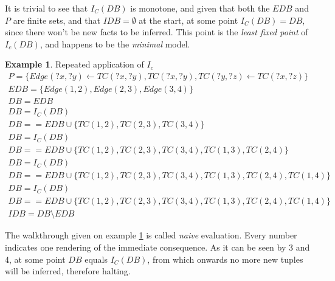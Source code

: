 \documentclass[manuscript,screen,review]{acmart}
\theoremstyle{definition}
\newtheorem{exmp}{Example}[section]
\begin{document}
It is trivial to see that $I_C(DB)$ is monotone, and given that both the $EDB$ and $P$ are finite sets, and that $IDB = \emptyset$ at the start,
at some point $I_C(DB) = DB$, since there won't be new facts to be inferred. This point is the \textit{least fixed point} of $I_c(DB)$\cite{datalog},
and happens to be the \textit{minimal} model.
\begin{exmp}{Repeated application of $I_c$}
	\begin{align}
		P = \{ Edge(?x, ?y) \leftarrow TC(?x, ?y), TC(?x, ?y), TC(?y, ?z) \leftarrow TC(?x, ?z) \} \nonumber             \\
		EDB = \{ Edge(1, 2), Edge(2, 3), Edge(3, 4) \}                                               \nonumber           \\
		DB = EDB                                                                                     \nonumber           \\
		DB = I_C(DB)                                                                                                     \\
		DB == EDB \cup \{ TC(1, 2), TC(2, 3), TC(3, 4) \}                                                      \nonumber \\
		DB = I_C(DB)                                                                                           \nonumber \\
		DB == EDB \cup \{ TC(1, 2), TC(2, 3), TC(3, 4), TC(1, 3), TC(2, 4) \}                                  \nonumber \\
		DB = I_C(DB)                                                                                                     \\
		DB == EDB \cup \{ TC(1, 2), TC(2, 3), TC(3, 4), TC(1, 3), TC(2, 4), TC(1, 4) \}                        \nonumber \\
		DB = I_C(DB)                                                                                                     \\
		DB == EDB \cup \{ TC(1, 2), TC(2, 3), TC(3, 4), TC(1, 3), TC(2, 4), TC(1, 4) \}                        \nonumber \\
		IDB = DB \setminus EDB
	\end{align}
	\label{ex5}
\end{exmp}

The walkthrough given on example \ref{ex5} is called \textit{naive} evaluation. Every number indicates one rendering of the immediate consequence. As it can be seen by 3 and 4, at some point $DB$ equals $I_C(DB)$, from which onwards no more new tuples will be inferred, therefore halting.
\end{document}
